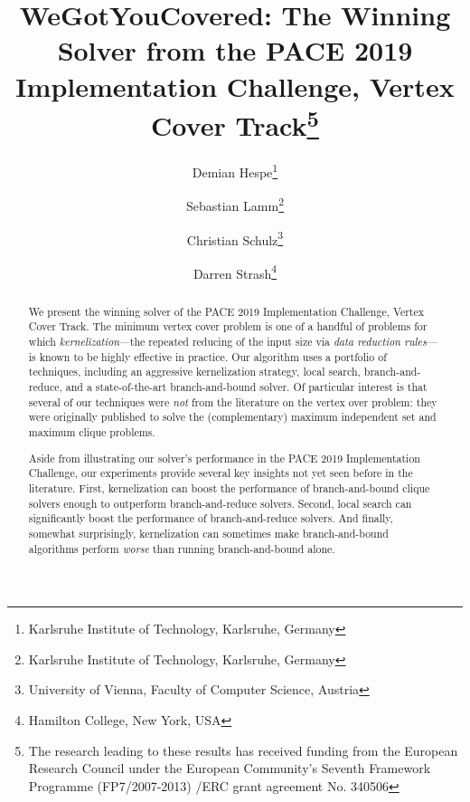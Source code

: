 \documentclass[twoside,leqno,twocolumn]{article}
\newcommand{\mytitle}{WeGotYouCovered: The Winning Solver from the PACE 2019 Implementation Challenge, Vertex Cover Track}
\begin{document}
\title{\mytitle\thanks{
    The research leading to these results has received funding from the European Research Council under the European Community's Seventh Framework Programme (FP7/2007-2013) /ERC grant agreement No. 340506}}
\author{Demian Hespe\thanks{Karlsruhe Institute of Technology, Karlsruhe, Germany} \and Sebastian Lamm\thanks{Karlsruhe Institute of Technology, Karlsruhe, Germany} \and Christian Schulz\thanks{University of Vienna, Faculty of Computer Science, Austria} \and Darren Strash\thanks{Hamilton College, New York, USA}}


\date{}


\maketitle
\begin{abstract}
We present the winning solver of the PACE 2019 Implementation Challenge, Vertex Cover Track. The minimum vertex cover problem is one of a handful of problems for which \emph{kernelization}---the repeated reducing of the input size via \emph{data reduction rules}---is known to be highly effective in practice. Our algorithm uses a portfolio of techniques, including an aggressive kernelization strategy, local search, branch-and-reduce, and a state-of-the-art branch-and-bound solver. Of particular interest is that several of our techniques were \emph{not} from the literature on the vertex over problem: they were originally published to solve the (complementary) maximum independent set and maximum clique problems. 

%
Aside from illustrating our solver's performance in the PACE 2019 Implementation Challenge, our experiments provide several key insights not yet seen before in the literature.
First, kernelization can boost the performance of branch-and-bound clique solvers enough to outperform branch-and-reduce solvers. Second, local search can significantly boost the performance of branch-and-reduce solvers. And finally, somewhat surprisingly, kernelization can sometimes make branch-and-bound algorithms perform \emph{worse} than running branch-and-bound alone.
\end{abstract}
\end{document}
